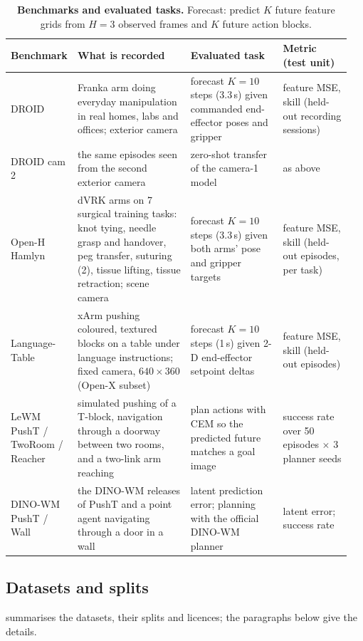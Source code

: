 \begin{table}[h]
\centering\scriptsize\setlength{\tabcolsep}{3pt}
\caption{\textbf{Benchmarks and evaluated tasks.} Forecast: predict $K$ future feature grids from $H{=}3$ observed frames and $K$ future action blocks.}
\label{tab:tasks}
\begin{tabular}{@{}p{0.15\linewidth}p{0.33\linewidth}p{0.27\linewidth}p{0.2\linewidth}@{}}
\toprule
Benchmark & What is recorded & Evaluated task & Metric (test unit) \\
\midrule
DROID & Franka arm doing everyday manipulation in real homes, labs and offices; exterior camera & forecast $K{=}10$ steps (3.3\,s) given commanded end-effector poses and gripper & feature MSE, skill (held-out recording sessions) \\
DROID cam 2 & the same episodes seen from the second exterior camera & zero-shot transfer of the camera-1 model & as above \\
Open-H Hamlyn & dVRK arms on 7 surgical training tasks: knot tying, needle grasp and handover, peg transfer, suturing (2), tissue lifting, tissue retraction; scene camera & forecast $K{=}10$ steps (3.3\,s) given both arms' pose and gripper targets & feature MSE, skill (held-out episodes, per task) \\
Language-Table & xArm pushing coloured, textured blocks on a table under language instructions; fixed camera, $640{\times}360$ (Open-X subset) & forecast $K{=}10$ steps (1\,s) given 2-D end-effector setpoint deltas & feature MSE, skill (held-out episodes) \\
LeWM PushT / TwoRoom / Reacher & simulated pushing of a T-block, navigation through a doorway between two rooms, and a two-link arm reaching & plan actions with CEM so the predicted future matches a goal image & success rate over 50 episodes $\times$ 3 planner seeds \\
DINO-WM PushT / Wall & the DINO-WM releases of PushT and a point agent navigating through a door in a wall & latent prediction error; planning with the official DINO-WM planner & latent error; success rate \\
\bottomrule
\end{tabular}
\end{table}

\FloatBarrier
\subsection{Datasets and splits}\label{app:data}
 summarises the datasets, their splits and licences; the paragraphs below give the details.

